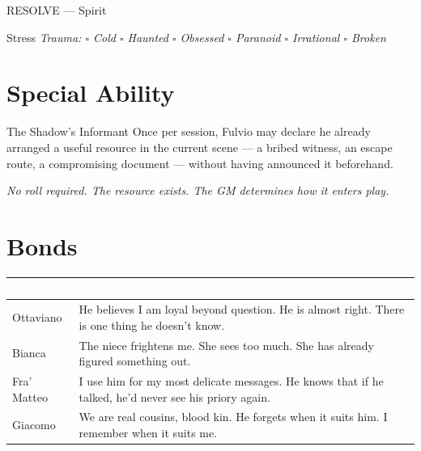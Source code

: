 \begin{attributoblock}[DoriaBlue]{RESOLVE --- Spirit}
  \begin{multicols}{2}
  \end{multicols}
\end{attributoblock}

\medskip
\begin{pgclockbox}{Stress \hfill {}}
  \small\textit{Trauma: $\square$ Cold \quad $\square$ Haunted \quad $\square$ Obsessed \quad $\square$ Paranoid \quad $\square$ Irrational \quad $\square$ Broken}
\end{pgclockbox}

\section*{Special Ability}
\begin{doriabox}{The Shadow's Informant}
  Once per session, Fulvio may declare he already arranged a useful resource in
  the current scene --- a bribed witness, an escape route, a compromising document
  --- without having announced it beforehand.

  \medskip\noindent\textit{No roll required. The resource exists. The GM determines how it enters play.}
\end{doriabox}

\section*{Bonds}
\begin{table}[h]
\centering\renewcommand{\arraystretch}{1.4}
\begin{tabularx}{\linewidth}{@{}L{2.4cm} X@{}}
  \toprule{}
  \textcolor{white}{\textbf{PC}} & \textcolor{white}{\textbf{Bond}} \\
  \midrule
  Ottaviano & He believes I am loyal beyond question. He is almost right. There is one thing he doesn't know. \\
  Bianca & The niece frightens me. She sees too much. She has already figured something out. \\
  Fra' Matteo & I use him for my most delicate messages. He knows that if he talked, he'd never see his priory again. \\
  Giacomo & We are real cousins, blood kin. He forgets when it suits him. I remember when it suits me. \\
  \bottomrule
\end{tabularx}
\end{table}


